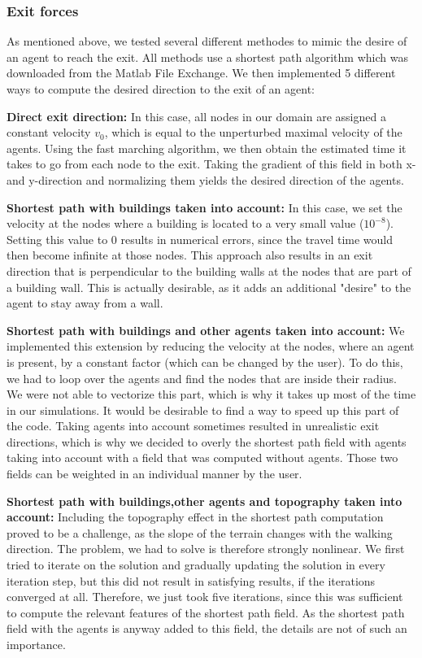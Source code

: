 \documentclass[11pt]{article}
\begin{document}
\subsubsection{Exit forces}
As mentioned above, we tested several different methodes to mimic the desire of an agent to reach the exit. All methods use a shortest path algorithm which was downloaded from the Matlab File Exchange. We then implemented 5 different ways to compute the desired direction to the exit of an agent:
\begin{description}
\item{\textbf{Direct exit direction: }}In this case, all nodes in our domain are assigned a constant velocity $v_0$, which is equal to the unperturbed maximal velocity of the agents. Using the fast marching algorithm, we then obtain the estimated time it takes to go from each node to the exit. Taking the gradient of this field in both x- and y-direction and normalizing them yields the desired direction of the agents.
\item{\textbf{Shortest path with buildings taken into account: }} In this case, we set the velocity at the nodes where a building is located to a very small value ($10^{-8}$). Setting this value to 0 results in numerical errors, since the travel time would then become infinite at those nodes. This approach also results in an exit direction that is perpendicular to the building walls at the nodes that are part of a building wall. This is actually desirable, as it adds an additional "desire" to the agent to stay away from a wall.
\item{\textbf{Shortest path with buildings and other agents taken into account: }} We implemented this extension by reducing the velocity at the nodes, where an agent is present, by a constant factor (which can be changed by the user). To do this, we had to loop over the agents and find the nodes that are inside their radius. We were not able to vectorize this part, which is why it takes up most of the time in our simulations. It would be desirable to find a way to speed up this part of the code. Taking agents into account sometimes resulted in unrealistic exit directions, which is why we decided to overly the shortest path field with agents taking into account with a field that was computed without agents. Those two fields can be weighted in an individual manner by the user.
\item{\textbf{Shortest path with buildings,other agents and topography taken into account: }}Including the topography effect in the shortest path computation proved to be a challenge, as the slope of the terrain changes with the walking direction. The problem, we had to solve is therefore strongly nonlinear. We first tried to iterate on the solution and gradually updating the solution in every iteration step, but this did not result in satisfying results, if the iterations converged at all. Therefore, we just took five iterations, since this was sufficient to compute the relevant features of the shortest path field. As the shortest path field with the agents is anyway added to this field, the details are not of such an importance.

\end{description}
\end{document}
